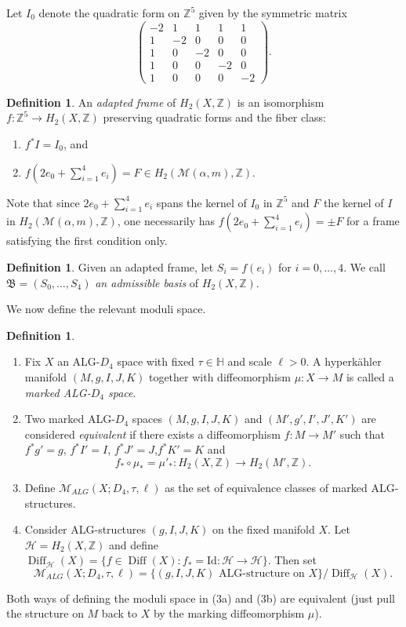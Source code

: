\documentclass[12pt,letterpaper,reqno]{amsart}
\def\bm#1{#1}%
\def\mathbf#1{#1}%
\theoremstyle{remark}
\theoremstyle{definition}
\newtheorem{defn}[thm]{Definition}
\numberwithin{thm}{section}
\numberwithin{equation}{section}
\numberwithin{figure}{section}
\newcommand{\Z}{\ensuremath{\mathbb Z}}
\newcommand{\bfalpha}{\ensuremath{\bm \alpha}}
\newcommand{\calH}{\mathcal H}
\newcommand{\calM}{\mathcal M}
\newcommand{\Id}{\ensuremath{\mathrm{Id}}}
\newcommand{\bfm}{\mathbf{m}}
\DeclareMathOperator{\Diff}{Diff}
\begin{document}
\bigskip


Let $I_0$ denote the quadratic form on $\Z^5$ given by the symmetric matrix
\begin{equation}\label{eq:I0}
\begin{pmatrix}
	-2 &  1 &1 &1 &1 \\
	1 & -2 & 0 & 0 & 0\\
	1 & 0 & -2 & 0 & 0 \\
	1 & 0 & 0 & -2 & 0 \\
	1 & 0 & 0 & 0 & -2 
\end{pmatrix}.\end{equation}
\begin{defn}
An \emph{adapted frame} of $H_2(X, \Z)$ is an isomorphism $f : \Z^5  \to H_2(X,\Z)$ preserving quadratic forms and the fiber class:
\begin{enumerate}
\item $f^* I = I_0$, and
\item $f(2 e_0 + \sum_{i=1}^4 e_i) = F \in H_2(\mathcal{M}(\bfalpha,\bfm),\Z)$.
\end{enumerate}
\end{defn}


Note that since $2e_0 + \sum_{i=1}^4 e_i$ spans the kernel of $I_0$ in $\Z^5$ and $F$ the kernel of $I$ in $H_2(\mathcal{M}(\bfalpha,\bfm),\Z)$, one necessarily has $f(2 e_0 + \sum_{i=1}^4 e_i) = \pm F$ for a frame satisfying the first condition only.
\begin{defn}
Given an adapted frame, let $S_i = f(e_i)$ for $i=0, \ldots, 4$. 
We call $\mathfrak{B} = (S_0, \ldots, S_4)$  \emph{an admissible basis} of $H_2(X,\Z)$. 
\end{defn}

\bigskip

We now define the relevant moduli space.
\begin{defn}\hfill
\begin{enumerate} 
\item
Fix $X$ an ALG-$D_4$ space  with fixed $\tau \in \mathbb H$ and scale $\ell>0$. A hyperk\"ahler manifold $(M, g, I,J,K)$ together with diffeomorphism $\mu : X \to M$ is called a \emph {marked ALG-$D_4$ space}. 
\item Two marked ALG-$D_4$ spaces $(M,g, I,J,K)$ and $(M',g', I',J',K')$ are considered \emph{equivalent} if there exists a diffeomorphism $f : M \to M'$ such that $f^*g' =g$, $f^* I'=I$, $f^* J'=J$,$f^* K'=K$ and 
\[
f_* \circ \mu_* = \mu'_* : H_2(X, \Z) \to H_2(M', \Z). 
\]
\item[(3a)] Define $\calM_{ALG}(X; D_4,\tau, \ell)$ as the set of equivalence classes of marked ALG-structures.
\item[(3b)] Consider ALG-structures $(g, I,J,K)$ on the fixed 	manifold $X$. Let $\calH=H_2(X, \Z)$ and define $\Diff_\calH(X) = \{ f \in \Diff(X) : f_* = \Id : \calH \to \calH \}$. Then set
\[
\calM_{ALG}(X;D_4,\tau, \ell) = \{ (g, I, J, K) \text{ ALG-structure on $X$}\} / \Diff_\calH(X).
\]
\end{enumerate}
\end{defn}
Both ways of defining the moduli space in (3a) and (3b) are equivalent (just pull the structure on $M$ back  to $X$ by the marking diffeomorphism $\mu$).
\end{document}
